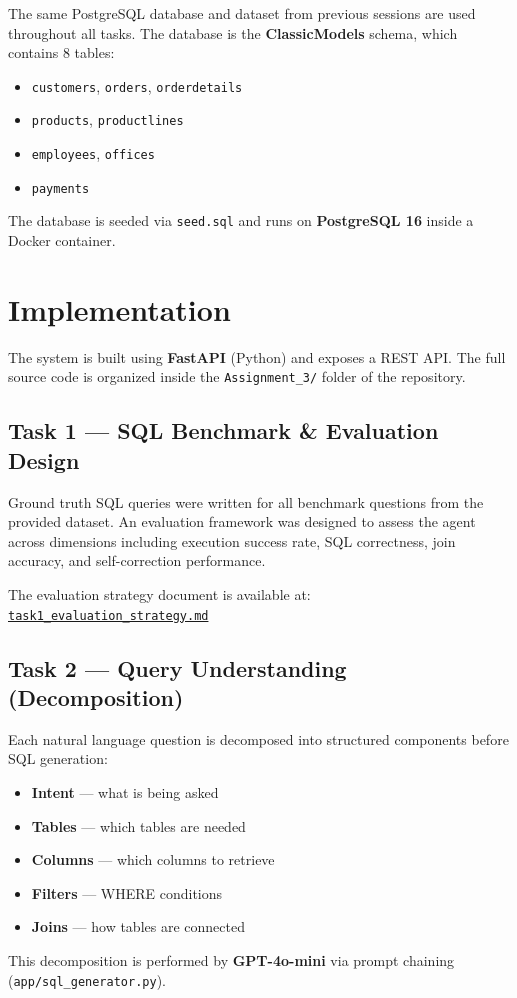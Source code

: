 \documentclass[12pt, a4paper]{article}
\begin{document}
The same PostgreSQL database and dataset from previous sessions are used throughout all tasks. The database is the \textbf{ClassicModels} schema, which contains 8 tables:

\begin{itemize}[leftmargin=1.5cm]
    \item \texttt{customers}, \texttt{orders}, \texttt{orderdetails}
    \item \texttt{products}, \texttt{productlines}
    \item \texttt{employees}, \texttt{offices}
    \item \texttt{payments}
\end{itemize}

The database is seeded via \texttt{seed.sql} and runs on \textbf{PostgreSQL 16} inside a Docker container.

\section{Implementation}

The system is built using \textbf{FastAPI} (Python) and exposes a REST API. The full source code is organized inside the \texttt{Assignment\_3/} folder of the repository.

\subsection*{Task 1 — SQL Benchmark \& Evaluation Design}
Ground truth SQL queries were written for all benchmark questions from the provided dataset. An evaluation framework was designed to assess the agent across dimensions including execution success rate, SQL correctness, join accuracy, and self-correction performance.

The evaluation strategy document is available at:\\
\href{https://github.com/VirajSawad1021/FuseAI/blob/main/Assignment_3/task1_evaluation_strategy.md}{\texttt{task1\_evaluation\_strategy.md}}

\subsection*{Task 2 — Query Understanding (Decomposition)}
Each natural language question is decomposed into structured components before SQL generation:
\begin{itemize}
    \item \textbf{Intent} — what is being asked
    \item \textbf{Tables} — which tables are needed
    \item \textbf{Columns} — which columns to retrieve
    \item \textbf{Filters} — WHERE conditions
    \item \textbf{Joins} — how tables are connected
\end{itemize}
This decomposition is performed by \textbf{GPT-4o-mini} via prompt chaining (\texttt{app/sql\_generator.py}).
\end{document}
